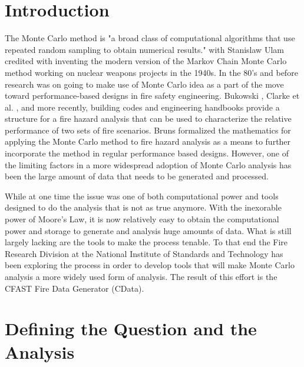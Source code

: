 \documentclass[12pt,twoside]{book}
\begin{document}
\cleardoublepage
\tableofcontents

\clearpage
\listoffigures

\listoftables


\mainmatter

%
%

\chapter{Introduction}

The Monte Carlo method is "a broad class of computational algorithms that use repeated random sampling to obtain numerical results." with Stanislaw Ulam credited with inventing the modern version of the Markov Chain Monte Carlo method working on nuclear weapons projects in the 1940s. In the 80’s and before research was on going to make use of Monte Carlo idea as a part of the move toward performance-based designs in fire safety engineering. Bukowski \cite{Bukowski_1985}, Clarke et al. \cite{Clarke_1990}, and more recently, building codes \cite{NFPA_5000} and engineering handbooks \cite{Hurley_2016} provide a structure for a fire hazard analysis that can be used to characterize the relative performance of two sets of fire scenarios. Bruns \cite{bruns_tn_2016} formalized the mathematics for applying the Monte Carlo method to fire hazard analysis as a means to further incorporate the method in regular performance based designs. However, one of the limiting factors in a more widespread adoption of Monte Carlo analysis has been the large amount of data that needs to be generated and processed.

While at one time the issue was one of both computational power and tools designed to do the analysis that is not as true anymore. With the inexorable power of Moore’s Law, it is now relatively easy to obtain the computational power and storage to generate and analysis huge amounts of data. What is still largely lacking are the tools to make the process tenable. To that end the Fire Research Division at the National Institute of Standards and Technology has been exploring the process \cite{NIST_TN_2041,Reneke_2017,Reneke_2018,Cleary_2019} in order to develop tools that will make Monte Carlo analysis a more widely used form of analysis. The result of this effort is the CFAST Fire Data Generator (CData).

%
%

\chapter{Defining the Question and the Analysis}
\end{document}

